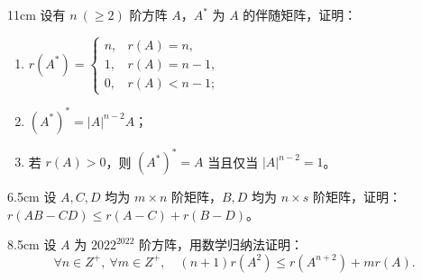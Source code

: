 \begin{problem}{}{11cm}
设有 $n\ (\ge 2)$ 阶方阵 $A$，$A^{*}$ 为 $A$ 的伴随矩阵，证明：
\begin{enumerate}[label=(\arabic*),leftmargin=2.2em,itemsep=0.3em,topsep=0.3em]
  \item $r(A^{*})=\begin{cases}n,&r(A)=n,\\1,&r(A)=n-1,\\0,&r(A)<n-1;\end{cases}$
  \item $(A^{*})^{*}=|A|^{n-2}A$；
  \item 若 $r(A)>0$，则 $(A^{*})^{*}=A$ 当且仅当 $|A|^{n-2}=1$。
\end{enumerate}
\end{problem}

\begin{problem}{}{6.5cm}
设 $A,C,D$ 均为 $m\times n$ 阶矩阵，$B,D$ 均为 $n\times s$ 阶矩阵，证明：$r(AB-CD)\le r(A-C)+r(B-D)$。
\end{problem}

\begin{problem}{}{8.5cm}
设 $A$ 为 $2022^{2022}$ 阶方阵，用数学归纳法证明：
\[
\forall n\in Z^{+},\ \forall m\in Z^{+},\quad (n+1)r(A^{2})\le r(A^{n+2})+mr(A).
\]
\end{problem}

